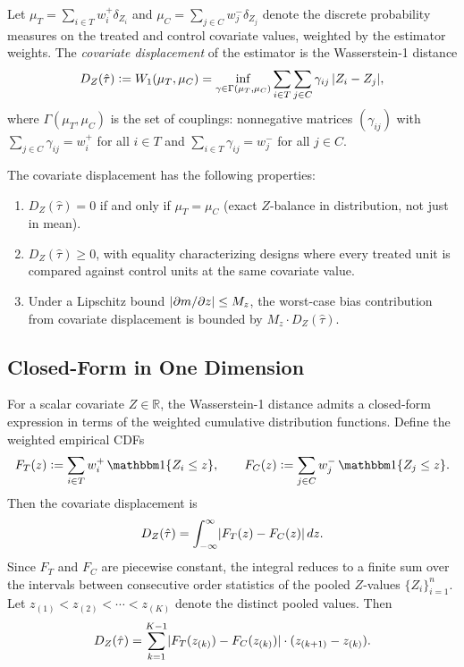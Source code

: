\begin{definition}\label{def:cov_displacement}
	Let $\mu_T = \sum_{i \in T} w_i^+ \delta_{Z_i}$ and $\mu_C = \sum_{j \in C} w_j^- \delta_{Z_j}$ denote the discrete probability measures on the treated and control covariate values, weighted by the estimator weights.
	The \emph{covariate displacement} of the estimator is the Wasserstein-1 distance
	\begin{equation}\label{eq:cov_displacement}
		D_Z(\hat{\tau}) \vcentcolon= W_1(\mu_T, \mu_C) = \inf_{\gamma \in \Gamma(\mu_T, \mu_C)} \sum_{i \in T} \sum_{j \in C} \gamma_{ij}\, \lvert Z_i - Z_j\rvert,
	\end{equation}
	where $\Gamma(\mu_T, \mu_C)$ is the set of couplings: nonnegative matrices $(\gamma_{ij})$ with $\sum_{j \in C} \gamma_{ij} = w_i^+$ for all $i \in T$ and $\sum_{i \in T} \gamma_{ij} = w_j^-$ for all $j \in C$.
\end{definition}

The covariate displacement has the following properties:
\begin{enumerate}
	\item $D_Z(\hat{\tau}) = 0$ if and only if $\mu_T = \mu_C$ (exact $Z$-balance in distribution, not just in mean).
	\item $D_Z(\hat{\tau}) \geq 0$, with equality characterizing designs where every treated unit is compared against control units at the same covariate value.
	\item Under a Lipschitz bound $\lvert\partial m / \partial z\rvert \leq M_z$, the worst-case bias contribution from covariate displacement is bounded by $M_z \cdot D_Z(\hat{\tau})$.
\end{enumerate}


\subsection{Closed-Form in One Dimension}\label{sec:appendix:zdisplacement:closedform}

For a scalar covariate $Z \in \mathbb{R}$, the Wasserstein-1 distance admits a closed-form expression in terms of the weighted cumulative distribution functions.
Define the weighted empirical CDFs
\begin{equation}\label{eq:weighted_cdfs}
	F_T(z) \defeq \sum_{i \in T} w_i^+\, \ind\{Z_i \leq z\}, \qquad F_C(z) \defeq \sum_{j \in C} w_j^-\, \ind\{Z_j \leq z\}.
\end{equation}
Then the covariate displacement is
\begin{equation}\label{eq:wasserstein_cdf}
	D_Z(\hat{\tau}) = \int_{-\infty}^{\infty} \lvert F_T(z) - F_C(z)\rvert\, dz.
\end{equation}
Since $F_T$ and $F_C$ are piecewise constant, the integral reduces to a finite sum over the intervals between consecutive order statistics of the pooled $Z$-values $\{Z_i\}_{i=1}^n$.
Let $z_{(1)} < z_{(2)} < \cdots < z_{(K)}$ denote the distinct pooled values.
Then
\begin{equation}\label{eq:wasserstein_sum}
	D_Z(\hat{\tau}) = \sum_{k=1}^{K-1} \lvert F_T(z_{(k)}) - F_C(z_{(k)})\rvert \cdot (z_{(k+1)} - z_{(k)}).
\end{equation}

